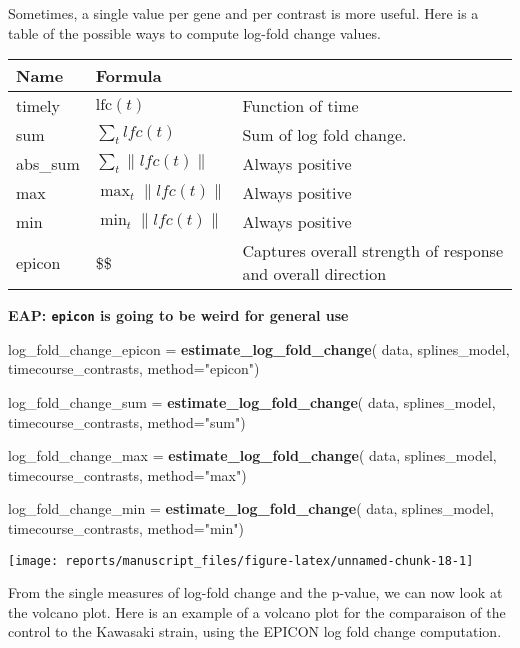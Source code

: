 \documentclass[9pt,a4paper,]{extarticle}
\newenvironment{Shaded}{\begin{snugshade}}{\end{snugshade}}
\newcommand{\DataTypeTok}[1]{\textcolor[rgb]{0.13,0.29,0.53}{#1}}
\newcommand{\KeywordTok}[1]{\textcolor[rgb]{0.13,0.29,0.53}{\textbf{#1}}}
\newcommand{\NormalTok}[1]{#1}
\newcommand{\StringTok}[1]{\textcolor[rgb]{0.31,0.60,0.02}{#1}}
\begin{document}
Sometimes, a single value per gene and per contrast is more useful. Here is a
table of the possible ways to compute log-fold change values.

\begin{longtable}[]{@{}lll@{}}
\toprule
Name & Formula &\tabularnewline
\midrule
\endhead
timely & \(\text{lfc}(t)\) & Function of time\tabularnewline
sum & \(\sum_t lfc(t)\) & Sum of log fold change.\tabularnewline
abs\_sum & \(\sum_t \|lfc(t)\|\) & Always positive\tabularnewline
max & \(\max_t \|lfc(t)\|\) & Always positive\tabularnewline
min & \(\min_t \|lfc(t)\|\) & Always positive\tabularnewline
epicon & \$\$ & Captures overall strength of response and overall direction\tabularnewline
\bottomrule
\end{longtable}

\textbf{EAP: \texttt{epicon} is going to be weird for general use}

\begin{Shaded}
\begin{Highlighting}[]
\NormalTok{log_fold_change_epicon =}\StringTok{ }\KeywordTok{estimate_log_fold_change}\NormalTok{(}
\NormalTok{    data, splines_model, timecourse_contrasts,  }\DataTypeTok{method=}\StringTok{"epicon"}\NormalTok{)}

\NormalTok{log_fold_change_sum =}\StringTok{ }\KeywordTok{estimate_log_fold_change}\NormalTok{(}
\NormalTok{    data, splines_model, timecourse_contrasts,  }\DataTypeTok{method=}\StringTok{"sum"}\NormalTok{)}

\NormalTok{log_fold_change_max =}\StringTok{ }\KeywordTok{estimate_log_fold_change}\NormalTok{(}
\NormalTok{    data, splines_model, timecourse_contrasts, }\DataTypeTok{method=}\StringTok{"max"}\NormalTok{)}

\NormalTok{log_fold_change_min =}\StringTok{ }\KeywordTok{estimate_log_fold_change}\NormalTok{(}
\NormalTok{    data, splines_model, timecourse_contrasts, }\DataTypeTok{method=}\StringTok{"min"}\NormalTok{)}
\end{Highlighting}
\end{Shaded}

\begin{center}\texttt{[image: reports/manuscript\_files/figure-latex/unnamed-chunk-18-1]} \end{center}

From the single measures of log-fold change and the p-value, we can now look
at the volcano plot. Here is an example of a volcano plot for the comparaison
of the control to the Kawasaki strain, using the EPICON log fold change
computation.
\end{document}
